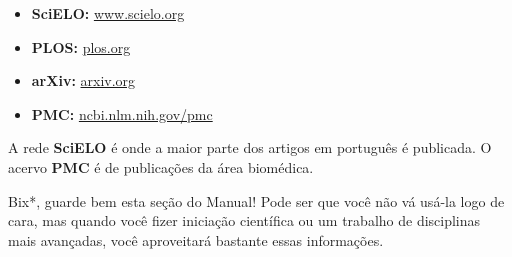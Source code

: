 \begin{itemize}
    \item  \textbf{SciELO:} \url{www.scielo.org}
    \item  \textbf{PLOS:} \url{plos.org}
    \item  \textbf{arXiv:} \url{arxiv.org}
    \item  \textbf{PMC:} \url{ncbi.nlm.nih.gov/pmc}
\end{itemize}

A rede \textbf{SciELO} é onde a maior parte dos artigos em português é
publicada. O acervo \textbf{PMC} é de publicações da área biomédica.

Bix*, guarde bem esta seção do Manual! Pode ser que você não vá usá-la logo de
cara, mas quando você fizer iniciação científica ou um trabalho de disciplinas
mais avançadas, você aproveitará bastante essas informações.
